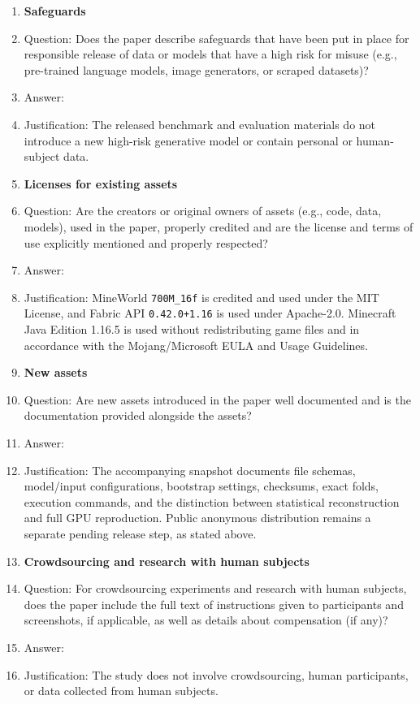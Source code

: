 \begin{enumerate}
\item {\bf Safeguards}
    \item[] Question: Does the paper describe safeguards that have been put in place for responsible release of data or models that have a high risk for misuse (e.g., pre-trained language models, image generators, or scraped datasets)?
    \item[] Answer: \answerNA{}
    \item[] Justification: The released benchmark and evaluation materials do not introduce a new high-risk generative model or contain personal or human-subject data.


\item {\bf Licenses for existing assets}
    \item[] Question: Are the creators or original owners of assets (e.g., code, data, models), used in the paper, properly credited and are the license and terms of use explicitly mentioned and properly respected?
    \item[] Answer: \answerYes{}
    \item[] Justification: MineWorld \texttt{700M\_16f} is credited and used under the MIT License, and Fabric API \texttt{0.42.0+1.16} is used under Apache-2.0. Minecraft Java Edition 1.16.5 is used without redistributing game files and in accordance with the Mojang/Microsoft EULA and Usage Guidelines.


\newpage
\item {\bf New assets}
    \item[] Question: Are new assets introduced in the paper well documented and is the documentation provided alongside the assets?
    \item[] Answer: \answerYes{}
    \item[] Justification: The accompanying snapshot documents file schemas, model/input configurations, bootstrap settings, checksums, exact folds, execution commands, and the distinction between statistical reconstruction and full GPU reproduction. Public anonymous distribution remains a separate pending release step, as stated above.


\item {\bf Crowdsourcing and research with human subjects}
    \item[] Question: For crowdsourcing experiments and research with human subjects, does the paper include the full text of instructions given to participants and screenshots, if applicable, as well as details about compensation (if any)? 
    \item[] Answer: \answerNA{}
    \item[] Justification: The study does not involve crowdsourcing, human participants, or data collected from human subjects.



\end{enumerate}
